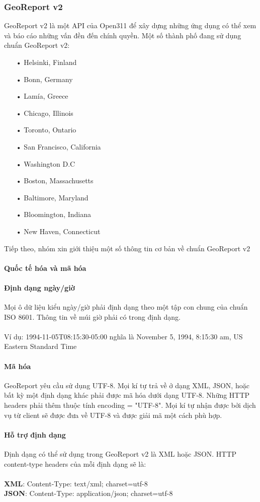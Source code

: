 \documentclass[a4paper]{article}
\begin{document}
\subsubsection{GeoReport v2}
GeoReport v2 là một API của Open311 để xây dựng những ứng dụng có thể xem và báo cáo những vấn đền đến chính quyền.
Một số thành phố đang sử dụng chuẩn GeoReport v2:
\begin{itemize}
    \item[•]Helsinki, Finland
	\item[•]Bonn, Germany
	\item[•]Lamía, Greece
	\item[•]Chicago, Illinois
	\item[•]Toronto, Ontario
	\item[•]San Francisco, California
	\item[•]Washington D.C
	\item[•]Boston, Massachusetts
	\item[•]Baltimore, Maryland
	\item[•]Bloomington, Indiana
	\item[•]New Haven, Connecticut
\end{itemize}
Tiếp theo, nhóm xin giới thiệu một số thông tin cơ bản về chuẩn GeoReport v2
\paragraph{Quốc tế hóa và mã hóa}
\paragraph*{Định dạng ngày/giờ}
Mọi ô dữ liệu kiểu ngày/giờ phải định dạng theo một tập con chung của chuẩn ISO 8601. Thông tin về múi giờ phải có trong định dạng.\\
\\
Ví dụ: 1994-11-05T08:15:30-05:00 nghĩa là  November 5, 1994, 8:15:30 am, US Eastern Standard Time

\paragraph*{Mã hóa}
GeoReport yêu cầu sử dụng UTF-8. Mọi kí tự trả về ở dạng XML, JSON, hoặc bất kỳ một định dạng khác phải được mã hóa dưới dạng UTF-8. Những HTTP headers phải thêm thuộc tính encoding = "UTF-8". Mọi kí tự nhận được bởi dịch vụ từ client sẽ được đưa về UTF-8 và được giải mã một cách phù hợp. 
\paragraph{Hỗ trợ định dạng}
Định dạng có thể sử dụng trong GeoReport v2 là XML hoặc JSON.
HTTP content-type headers của mỗi định dạng sẽ là: \\
\\
\textbf{XML}: Content-Type: text/xml; charset=utf-8\\
\textbf{JSON}: Content-Type: application/json; charset=utf-8
\end{document}
